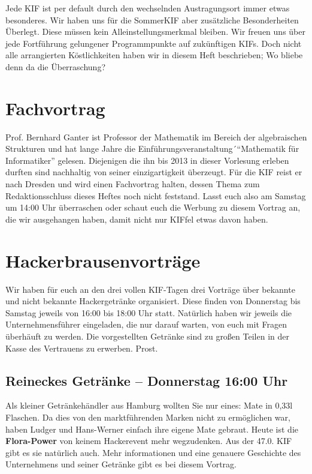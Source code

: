 
Jede KIF ist per default durch den wechselnden Austragungsort immer etwas besonderes. Wir haben uns
für die SommerKIF aber zusätzliche Besonderheiten Überlegt. Diese müssen kein Alleinstellungsmerkmal
bleiben. Wir freuen uns über jede Fortführung gelungener Programmpunkte auf zukünftigen KIFs. Doch
nicht alle arrangierten Köstlichkeiten haben wir in diesem Heft beschrieben; Wo bliebe denn da die
Überraschung?

\section*{Fachvortrag}
Prof. Bernhard Ganter ist Professor der Mathematik im Bereich der algebraischen Strukturen und hat
lange Jahre die Einführungsveranstaltung´\enquote{Mathematik für Informatiker} gelesen. Diejenigen
die ihn bis 2013 in dieser Vorlesung erleben durften sind nachhaltig von seiner einzigartigkeit
überzeugt. Für die KIF reist er nach Dresden und wird einen Fachvortrag halten, dessen Thema zum
Redaktionsschluss dieses Heftes noch nicht feststand. Lasst euch also am Samstag um 14:00 Uhr
überraschen oder schaut euch die Werbung zu diesem Vortrag an, die wir ausgehangen haben, damit
nicht nur KIFfel etwas davon haben. 

\section*{Hackerbrausenvorträge}
Wir haben für euch an den drei vollen KIF-Tagen drei Vorträge über bekannte und nicht bekannte
Hackergetränke organisiert. Diese finden von Donnerstag bis Samstag jeweils von 16:00 bis 18:00 Uhr
statt. Natürlich haben wir jeweils die Unternehmensführer eingeladen, die nur darauf warten, von
euch mit Fragen überhäuft zu werden. Die vorgestellten Getränke sind zu großen Teilen in der Kasse
des Vertrauens zu erwerben. Prost.

\subsection*{Reineckes Getränke -- Donnerstag 16:00 Uhr}
Als kleiner Getränkehändler aus Hamburg wollten Sie nur eines: Mate in 0,33l Flaschen. Da dies von
den marktführenden Marken nicht zu ermöglichen war, haben Ludger und Hans-Werner einfach ihre eigene
Mate gebraut. Heute ist die \textbf{Flora-Power} von keinem Hackerevent mehr wegzudenken. Aus der
47.0. KIF gibt es sie natürlich auch. Mehr informationen und eine genauere Geschichte des
Unternehmens und seiner Getränke gibt es bei diesem Vortrag.

